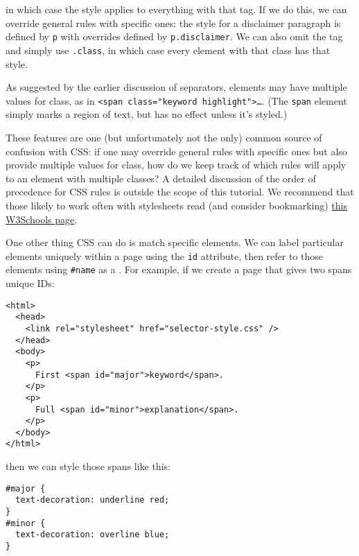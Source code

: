 \noindent
in which case the style applies to everything with that tag.
If we do this,
we can override general rules with specific ones:
the style for a disclaimer paragraph is defined by \texttt{p} with overrides defined by \texttt{p.disclaimer}.
We can also omit the tag and simply use \texttt{.class},
in which case every element with that class has that style.


As suggested by the earlier discussion of separators,
elements may have multiple values for class,
as in \texttt{{\textless}span\ class="keyword\ highlight"{\textgreater}{\ldots}}.
(The \texttt{span} element simply marks a region of text,
but has no effect unless it's styled.)

These features are one
(but unfortunately not the only)
common source of confusion with CSS:
if one may override general rules with specific ones
but also provide multiple values for class,
how do we keep track of which rules will apply to an element with multiple classes?
A detailed discussion of the order of precedence for CSS rules
is outside the scope of this tutorial. We recommend that those
likely to work often with stylesheets read (and consider bookmarking)
\href{https://www.w3schools.com/css/css_specificity.asp}{this W3Schools page}.

One other thing CSS can do is match specific elements.
We can label particular elements uniquely within a page using the \texttt{id} attribute,
then refer to those elements using \texttt{\#name} as a .
For example,
if we create a page that gives two spans unique IDs:

\begin{verbatim}
<html>
  <head>
    <link rel="stylesheet" href="selector-style.css" />
  </head>
  <body>
    <p>
      First <span id="major">keyword</span>.
    </p>
    <p>
      Full <span id="minor">explanation</span>.
    </p>
  </body>
</html>
\end{verbatim}

\noindent
then we can style those spans like this:

\begin{verbatim}
#major {
  text-decoration: underline red;
}
#minor {
  text-decoration: overline blue;
}
\end{verbatim}

